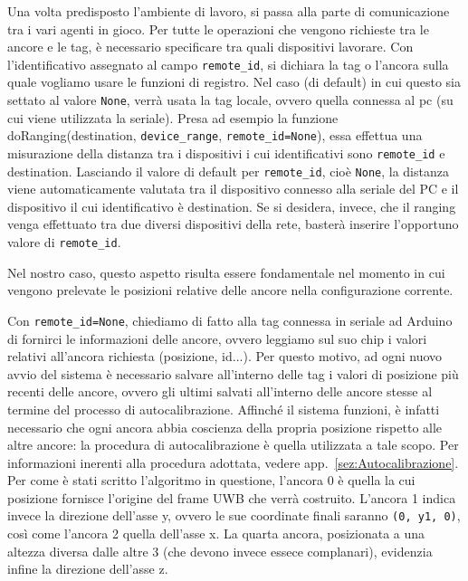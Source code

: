 Una volta predisposto l'ambiente di lavoro, si passa alla parte di comunicazione tra i vari agenti in gioco. Per tutte le operazioni che vengono richieste 
tra le ancore e le tag, è necessario specificare tra quali dispositivi lavorare. 
Con l'identificativo assegnato al campo \verb|remote_id|, si dichiara la tag o l'ancora sulla quale vogliamo usare le funzioni di registro. Nel caso (di default) 
in cui questo sia settato al valore \verb|None|, verrà usata la tag locale, ovvero quella connessa al pc (su cui viene utilizzata la seriale).
Presa ad esempio la funzione doRanging(destination, \verb|device_range|, \verb|remote_id=None|), essa effettua una misurazione della distanza tra i dispositivi
i cui identificativi sono \verb|remote_id| e destination. Lasciando il valore di default per \verb|remote_id|, cioè \verb|None|, la distanza viene automaticamente
valutata tra il dispositivo connesso alla seriale del PC e il dispositivo il cui identificativo è destination. 
Se si desidera, invece, che il ranging venga effettuato tra due diversi dispositivi della rete, basterà inserire l’opportuno valore di \verb|remote_id|.

Nel nostro caso, questo aspetto risulta essere fondamentale nel momento in cui vengono prelevate le posizioni relative delle ancore nella configurazione corrente. 

Con \verb|remote_id=None|, chiediamo di fatto alla tag connessa in seriale ad Arduino di fornirci le informazioni delle ancore, ovvero leggiamo sul suo chip i valori 
relativi all'ancora richiesta (posizione, id...).
Per questo motivo, ad ogni nuovo avvio del sistema è necessario salvare all'interno delle tag i valori di posizione più recenti delle ancore, ovvero gli ultimi 
salvati all'interno delle ancore stesse al termine del processo di autocalibrazione.
Affinché il sistema funzioni, è infatti necessario che ogni ancora abbia coscienza della propria posizione rispetto alle altre ancore: la procedura di 
autocalibrazione è quella utilizzata a tale scopo.
Per informazioni inerenti alla procedura adottata, vedere app.~\ref{sez:Autocalibrazione}. Per come è stati scritto l'algoritmo in questione, l'ancora 0 è quella 
la cui posizione fornisce l'origine del frame UWB che verrà costruito. 
L'ancora 1 indica invece la direzione dell'asse y, ovvero le sue coordinate finali saranno \verb|(0, y1, 0)|, così come l'ancora 2 quella dell'asse x. La quarta 
ancora, posizionata a una altezza diversa dalle altre 3 (che devono invece essece complanari), evidenzia infine la direzione dell'asse z.

